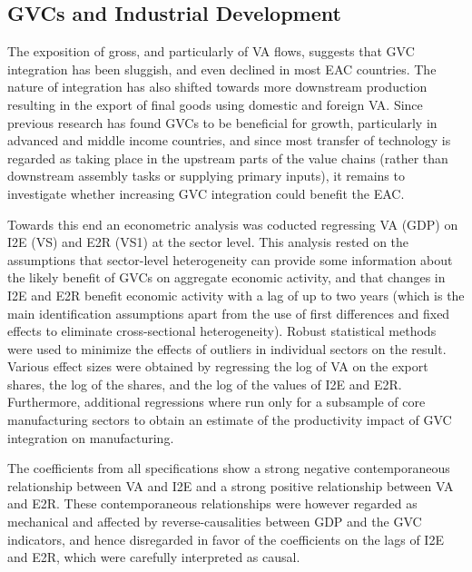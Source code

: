 \documentclass[a4paper]{article}
\begin{document}
\subsection{GVCs and Industrial Development} 

The exposition of gross, and particularly of VA flows, suggests that GVC integration has been sluggish, and even declined in most EAC countries. The nature of integration has also shifted towards more downstream production resulting in the export of final goods using domestic and foreign VA. Since previous research has found GVCs to be beneficial for growth, particularly in advanced and middle income countries, and since most transfer of technology is regarded as taking place in the upstream parts of the value chains (rather than downstream assembly tasks or supplying primary inputs), it remains to investigate whether increasing GVC integration could benefit the EAC. \newline

Towards this end an econometric analysis was coducted regressing VA (GDP) on I2E (VS) and E2R (VS1) at the sector level. This analysis rested on the assumptions that sector-level heterogeneity can provide some information about the likely benefit of GVCs on aggregate economic activity, and that changes in I2E and E2R benefit economic activity with a lag of up to two years (which is the main identification assumptions apart from the use of first differences and fixed effects to eliminate cross-sectional heterogeneity). Robust statistical methods were used to minimize the effects of outliers in individual sectors on the result. Various effect sizes were obtained by regressing the log of VA on the export shares, the log of the shares, and the log of the values of I2E and E2R. Furthermore, additional regressions where run only for a subsample of core manufacturing sectors to obtain an estimate of the productivity impact of GVC integration on manufacturing. \newline

The coefficients from all specifications show a strong negative contemporaneous relationship between VA and I2E and a strong positive relationship between VA and E2R. These contemporaneous relationships were however regarded as mechanical and affected by reverse-causalities between GDP and the GVC indicators, and hence disregarded in favor of the coefficients on the lags of I2E and E2R, which were carefully interpreted as causal. \newline
\end{document}
